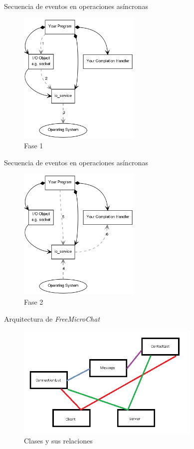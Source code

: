 \documentclass[spanish,xcolor=dvipsnames,svgnames]{beamer}
\newcommand{\freemc}{\textit{FreeMicroChat }}
\begin{document}
\begin{frame}{Secuencia de eventos en operaciones asíncronas}
  \begin{figure}[h]
    \includegraphics[width=165pt]{img/async_op1.png}
    \caption{Fase 1}
  \end{figure}
\end{frame}

\begin{frame}{Secuencia de eventos en operaciones asíncronas}
  \begin{figure}[h]
    \includegraphics[width=165pt]{img/async_op2.png}
    \caption{Fase 2}
  \end{figure}
\end{frame}

\begin{frame}{Arquitectura de \freemc}
\begin{block}{}
  \begin{figure}[h]
    \includegraphics[width=250pt]{img/Arquitectura.png}
    \caption{Clases y sus relaciones}
  \end{figure}
\end{block}
\end{frame}
\end{document}
